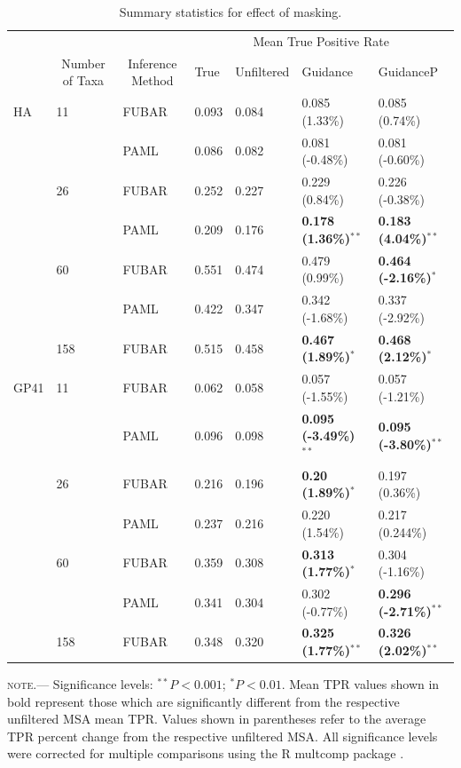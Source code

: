 \documentclass[11pt]{article}
\begin{document}
\begin{table}[htbp]
\begin{adjustwidth}{-1.85cm}{}
\caption {\label{tab:summarystats} Summary statistics for effect of masking.}
\begin{tabular}{l l l l l l l}
\hline\noalign{\smallskip}
& & & \multicolumn{4}{c}{Mean True Positive Rate} \\
\cline{4-7}\noalign{\smallskip}
\multicolumn{1}{c}{Selective Profile} & \multicolumn{1}{c}{Number of Taxa} & \multicolumn{1}{c}{Inference Method} & \multicolumn{1}{l}{True} & \multicolumn{1}{l}{Unfiltered} & \multicolumn{1}{l}{Guidance} & \multicolumn{1}{l}{GuidanceP} \\
\noalign{\smallskip}\hline\noalign{\smallskip}
HA  &  11  &  FUBAR  &  0.093  &  0.084  &  0.085 (1.33\%)  &  0.085 (0.74\%) \\
  &    &  PAML  &  0.086  &  0.082  &  0.081 (-0.48\%)  &  0.081 (-0.60\%)\\
\hline
 & 26 & FUBAR & 0.252 & 0.227 & 0.229 (0.84\%) & 0.226 (-0.38\%) \\
 &   & PAML & 0.209 & 0.176 & \textbf{0.178 (1.36\%)$^{\ast\ast}$} & \textbf{0.183 (4.04\%)$^{\ast\ast}$} \\
\hline
 & 60 & FUBAR & 0.551 & 0.474 & 0.479 (0.99\%) & \textbf{0.464 (-2.16\%)$^{\ast}$}  \\
 &  & PAML & 0.422 & 0.347 & 0.342 (-1.68\%) & 0.337 (-2.92\%) \\
 \hline
 & 158 & FUBAR & 0.515 & 0.458 & \textbf{0.467 (1.89\%)$^{\ast}$} & \textbf{0.468 (2.12\%)$^{\ast}$} \\
\hline
GP41  &  11 &  FUBAR  &  0.062  &  0.058  &  0.057 (-1.55\%)  &  0.057 (-1.21\%)\\
  &    &  PAML  &  0.096  &  0.098  &  \textbf{0.095 (-3.49\%)$^{\ast\ast}$}  &  \textbf{0.095 (-3.80\%)$^{\ast\ast}$} \\
\hline
 & 26 & FUBAR & 0.216 & 0.196 & \textbf{0.20 (1.89\%)$^{\ast}$} & 0.197 (0.36\%) \\
 & & PAML & 0.237 & 0.216 & 0.220 (1.54\%) & 0.217 (0.244\%) \\
 \hline
 & 60 & FUBAR & 0.359 & 0.308 & \textbf{0.313 (1.77\%)$^{\ast}$} & 0.304 (-1.16\%)\\
 & & PAML & 0.341 & 0.304 & 0.302 (-0.77\%) & \textbf{0.296 (-2.71\%)$^{\ast\ast}$} \\
 \hline
 & 158 & FUBAR & 0.348 & 0.320 & \textbf{0.325 (1.77\%)$^{\ast\ast}$} & \textbf{0.326 (2.02\%)$^{\ast\ast}$} \\
 \hline
\end{tabular}
\newline
\textsc{note.}--- Significance levels:  $^{\ast\ast} P < 0.001$; $^{\ast} P < 0.01$. Mean TPR values shown in bold represent those which are significantly different from the respective unfiltered MSA mean TPR. Values shown in parentheses refer to the average TPR percent change from the respective unfiltered MSA. All significance levels were corrected for multiple comparisons using the R multcomp package \citep{Hothorn2008}.
\end{adjustwidth}
\end{table}
\end{document}
